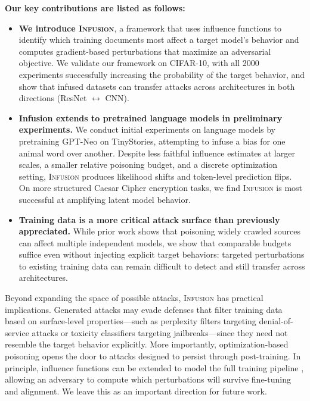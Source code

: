 \documentclass{article} %
\begin{document}
\break
\textbf{Our key contributions are listed as follows:}

\begin{itemize}
    \item \textbf{We introduce \textsc{Infusion}}, a framework that uses influence functions to identify which training documents most affect a target model's behavior and computes gradient-based perturbations that maximize an adversarial objective. We validate our framework on CIFAR-10, with all 2000 experiments successfully increasing the probability of the target behavior, and show that infused datasets can transfer attacks across architectures in both directions (ResNet $\leftrightarrow$ CNN).
    \item \textbf{Infusion extends to pretrained language models in preliminary experiments.} We conduct initial experiments on language models by pretraining GPT-Neo on TinyStories, attempting to infuse a bias for one animal word over another. Despite less faithful influence estimates at larger scales, a smaller relative poisoning budget, and a discrete optimization setting, \textsc{Infusion} produces likelihood shifts and token-level prediction flips. On more structured Caesar Cipher encryption tasks, we find \textsc{Infusion} is most successful at amplifying latent model behavior.
    \item \textbf{Training data is a more critical attack surface than previously appreciated.}  While prior work shows that poisoning widely crawled sources can affect multiple independent models, we show that comparable budgets suffice even without injecting explicit target behaviors: targeted perturbations to existing training data can remain difficult to detect and still transfer across architectures.
\end{itemize}

Beyond expanding the space of possible attacks, \textsc{Infusion} has practical implications. Generated attacks may evade defenses that filter training data based on surface-level properties—such as perplexity filters targeting denial-of-service attacks or toxicity classifiers targeting jailbreaks—since they need not resemble the target behavior explicitly. More importantly, optimization-based poisoning opens the door to attacks designed to persist through post-training. In principle, influence functions can be extended to model the full training pipeline \citep{source}, allowing an adversary to compute which perturbations will survive fine-tuning and alignment. We leave this as an important direction for future work.
\end{document}
